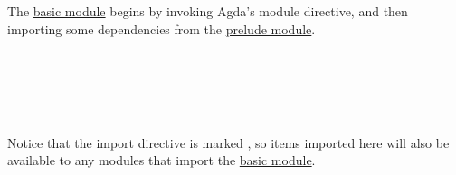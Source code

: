 \documentclass[sigplan,screen]{acmart}
\newcommand\preludemodule{\href{https://gitlab.com/ualib/ualib.gitlab.io/-/blob/master/prelude.lagda.rst}{prelude module}\xspace}
\newcommand\basicmodule{\href{https://gitlab.com/ualib/ualib.gitlab.io/-/blob/master/basic.lagda.rst}{basic module}\xspace}
\newcommand\preludemodule{\href{anonymizedLink/prelude.lagda.rst}{prelude module}\xspace}
\newcommand\basicmodule{\href{anonymizedLink/basic.lagda.rst}{basic module}\xspace}
\begin{document}
The \basicmodule begins by invoking Agda's module directive, and then importing some dependencies from the \preludemodule.
\begin{code}%
\>[0]\AgdaSpace{}%
\AgdaSpace{}%
\<%
\\
\\[\AgdaEmptyExtraSkip]%
\>[0]\AgdaSpace{}%
\AgdaSpace{}%
\AgdaSpace{}%
\AgdaSpace{}%
\AgdaSymbol{(}\AgdaSymbol{;}\AgdaSpace{}%
\AgdaSymbol{;}\AgdaSpace{}%
\AgdaSymbol{;}\AgdaSpace{}%
\AgdaSymbol{;}\AgdaSpace{}%
\AgdaSymbol{;}\AgdaSpace{}%
\AgdaSymbol{;}\AgdaSpace{}%
\AgdaSymbol{;}\<%
\\
\>[0][@{}l@{\AgdaIndent{0}}]%
\>[2]\AgdaSymbol{;}\AgdaSpace{}%
\AgdaSymbol{;}\AgdaSymbol{;}\AgdaSpace{}%
\AgdaOperator{\AgdaInductiveConstructor{\AgdaUnderscore{},\AgdaUnderscore{}}}\AgdaSymbol{;}\AgdaSpace{}%
\AgdaSymbol{;}\AgdaSpace{}%
\AgdaSymbol{;}\AgdaSpace{}%
\AgdaSymbol{;}\AgdaSpace{}%
\AgdaSymbol{;}\AgdaSpace{}%
\AgdaSymbol{;}\AgdaSpace{}%
\AgdaSymbol{;}\AgdaSpace{}%
\AgdaSymbol{;}\AgdaSpace{}%
\AgdaSymbol{;}\AgdaSpace{}%
\AgdaSymbol{;}\AgdaSpace{}%
\AgdaSymbol{;}\AgdaSpace{}\<%
\\
\>[0][@{}l@{\AgdaIndent{0}}]%
\>[2]\AgdaSymbol{;}\AgdaSpace{}%
\AgdaSymbol{)}\AgdaSpace{}%
\<%
\end{code}
Notice that the import directive is marked , so items imported here will also be available to any modules that import the \basicmodule.
\end{document}
